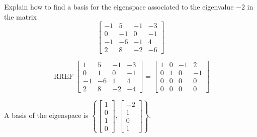 
\begin{exerciseStatement}


Explain how to find a basis for the eigenspace associated to the eigenvalue \( -2 \) in the matrix \[ \left[\begin{array}{cccc}
-1 & 5 & -1 & -3 \\
0 & -1 & 0 & -1 \\
-1 & -6 & -1 & 4 \\
2 & 8 & -2 & -6
\end{array}\right] \]


\end{exerciseStatement}
    
\begin{exerciseAnswer} 


\[\operatorname{RREF} \left[\begin{array}{cccc}
1 & 5 & -1 & -3 \\
0 & 1 & 0 & -1 \\
-1 & -6 & 1 & 4 \\
2 & 8 & -2 & -4
\end{array}\right] = \left[\begin{array}{cccc}
1 & 0 & -1 & 2 \\
0 & 1 & 0 & -1 \\
0 & 0 & 0 & 0 \\
0 & 0 & 0 & 0
\end{array}\right] \]



A basis of the eigenspace is \( \left\{ \left[\begin{array}{c}
1 \\
0 \\
1 \\
0
\end{array}\right] , \left[\begin{array}{c}
-2 \\
1 \\
0 \\
1
\end{array}\right] \right\} \).


\end{exerciseAnswer}
    
